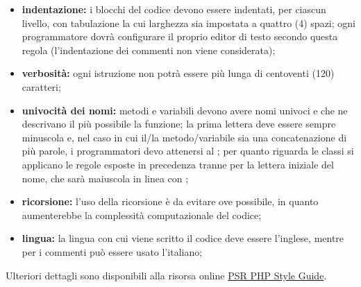 \begin{itemize}
\begin{itemize}
\begin{lstlisting}[language=php,captionpos=b,caption={Esempio per la sintassi PHP}]
		namespace Vendor\Package;

		use Vendor\Package\{ClassA as A, ClassB, ClassC as C};
		use Vendor\Package\SomeNamespace\ClassD as D;

		use function Vendor\Package\{functionA, functionB, functionC};

		use const Vendor\Package\{ConstantA, ConstantB, ConstantC};

		class Foo extends Bar implements FooInterface
		{
				public function sampleFunction(int $a, int $b = null): array
				{
						if ($a === $b) {
								bar();
						} elseif ($a > $b) {
								$foo->bar($arg1);
						} else {
								BazClass::bar($arg2, $arg3);
						}
				}

				final public static function bar()
				{
						// method body
				}
		}
								\end{lstlisting}
								\item \textbf{indentazione:} i blocchi del codice devono essere indentati, per ciascun livello, con tabulazione la cui larghezza sia impostata a quattro (4) spazi; ogni programmatore dovrà configurare il proprio editor di testo secondo questa regola (l'indentazione dei commenti non viene considerata);
								\item \textbf{verbosità:} ogni istruzione non potrà essere più lunga di centoventi (120) caratteri;
								\item \textbf{univocità dei nomi:} metodi e variabili devono avere nomi univoci e che ne descrivano il più possibile la funzione; la prima lettera deve essere sempre minuscola e, nel caso in cui il/la metodo/variabile sia una concatenazione di più parole, i programmatori devo attenersi al ; per quanto riguarda le classi si applicano le regole esposte in precedenza tranne per la lettera iniziale del nome, che sarà maiuscola in linea con ;
								\item \textbf{ricorsione:} l’uso della ricorsione è da evitare ove possibile, in quanto aumenterebbe la complessità computazionale del codice;
								\item \textbf{lingua:} la lingua con cui viene scritto il codice deve essere l’inglese, mentre per i commenti può essere usato l'italiano;
							\end{itemize}
							Ulteriori dettagli sono disponibili alla risorsa online \href{https://www.php-fig.org/psr/psr-12}{PSR PHP Style Guide}.
					\end{itemize}

